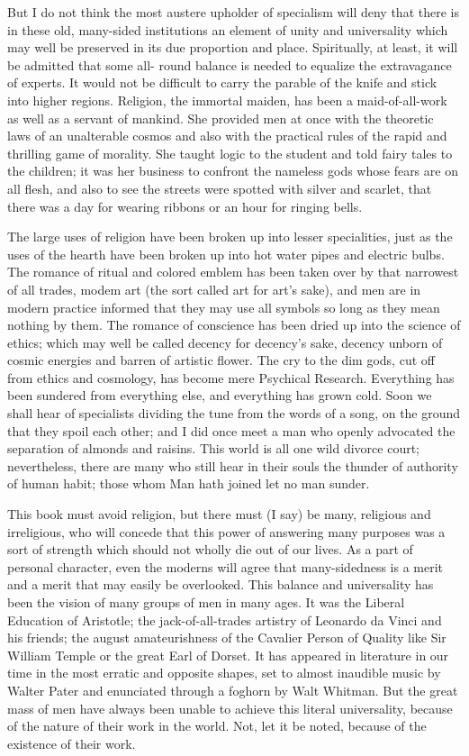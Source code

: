 \documentclass[final,10pt,letterpaper,twocolumn,openany]{book}
\begin{document}
But I do not think the most austere upholder of
specialism will deny that there is in these old, many-sided institutions an
element of unity and universality which may well be preserved in its due
proportion and place. Spiritually, at least, it will be admitted that some all-
round balance is needed to equalize the extravagance of experts. It would
not be difficult to carry the parable of the knife and stick into higher
regions. Religion, the immortal maiden, has been a maid-of-all-work as
well as a servant of mankind. She provided men at once with the theoretic
laws of an unalterable cosmos and also with the practical rules of the rapid
and thrilling game of morality. She taught logic to the student and told
fairy tales to the children; it was her business to confront the nameless
gods whose fears are on all flesh, and also to see the streets were spotted
with silver and scarlet, that there was a day for wearing ribbons or an hour
for ringing bells. 

The large uses of religion have been broken up into
lesser specialities, just as the uses of the hearth have been broken up into
hot water pipes and electric bulbs. The romance of ritual and colored
emblem has been taken over by that narrowest of all trades, modem art
(the sort called art for art's sake), and men are in modern practice informed
that they may use all symbols so long as they mean nothing by them. The
romance of conscience has been dried up into the science of ethics; which
may well be called decency for decency's sake, decency unborn of cosmic
energies and barren of artistic flower. The cry to the dim gods, cut off from
ethics and cosmology, has become mere Psychical Research. Everything
has been sundered from everything else, and everything has grown cold.
Soon we shall hear of specialists dividing the tune from the words of a
song, on the ground that they spoil each other; and I did once meet a man
who openly advocated the separation of almonds and raisins. This world is
all one wild divorce court; nevertheless, there are many who still hear in
their souls the thunder of authority of human habit; those whom Man hath
joined let no man sunder.

This book must avoid religion, but there must (I say) be many,
religious and irreligious, who will concede that this power of answering
many purposes was a sort of strength which should not wholly die out of
our lives. As a part of personal character, even the moderns will agree that
many-sidedness is a merit and a merit that may easily be overlooked. This
balance and universality has been the vision of many groups of men in
many ages. It was the Liberal Education of Aristotle; the jack-of-all-trades
artistry of Leonardo da Vinci and his friends; the august amateurishness of
the Cavalier Person of Quality like Sir William Temple or the great Earl of
Dorset. It has appeared in literature in our time in the most erratic and
opposite shapes, set to almost inaudible music by Walter Pater and
enunciated through a foghorn by Walt Whitman. But the great mass of
men have always been unable to achieve this literal universality, because
of the nature of their work in the world. Not, let it be noted, because of the
existence of their work. 
\end{document}

